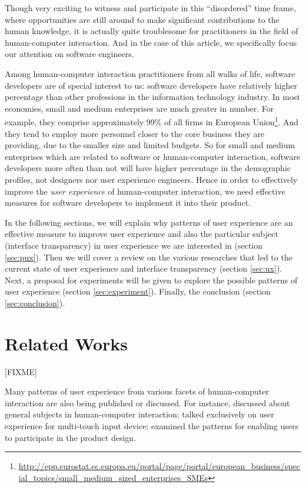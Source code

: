 \documentclass{acm_proc_article-sp}
\begin{document}
Though very exciting to witness and participate in this ``disordered''
time frame, where opportunities are still around to make significant
contributions to the human knowledge, it is actually quite troublesome
for practitioners in the field of human-computer interaction. And in
the case of this article, we specifically focus our attention on
software engineers.

Among human-computer interaction practitioners from all walks of life,
software developers are of special interest to us: software developers
have relatively higher percentage than other professions in the
information technology industry. In most economies, small and medium
enterprises are much greater in number. For example, they comprise
approximately 99\% of all firms in European
Union\footnote{\url{http://epp.eurostat.ec.europa.eu/portal/page/portal/european_business/special_topics/small_medium_sized_enterprises_SMEs}}. And
they tend to employ more personnel closer to the core business they
are providing, due to the smaller size and limited budgets. So for
small and medium enterprises which are related to software or
human-computer interaction, software developers more often than not
will have higher percentage in the demographic profiles, not designers
nor user experience engineers. Hence in order to effectively improve
the \textit{user experience} of human-computer interaction, we need
effective measures for software developers to implement it into their
product.

In the following sections, we will explain why patterns of user
experience are an effective measure to improve user experience and
also the particular subject (interface transparency) in user
experience we are interested in (section \ref{sec:pux}). Then we will
cover a review on the various researches that led to the current state
of user experience and interface transparency (section
\ref{sec:ux}). Next, a proposal for experiments will be given to
explore the possible patterns of user experience (section
\ref{sec:experiment}). Finally, the conclusion (section
\ref{sec:conclusion}).


\section{Related Works}
\label{sec:relatedworks}
[FIXME]

Many patterns of user experience from various facets of human-computer
interaction are also being published or discussed.  For instance,
\citet{patterns:tidwell} discussed about general subjects in
human-computer interaction; \citet{touch:boudreaux} talked exclusively
on user experience for multi-touch input device;
\citet{participatory:dearden} examined the patterns for enabling users
to participate in the product design.
\end{document}
